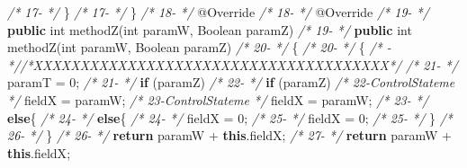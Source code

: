 \documentclass[
]{article}
\newenvironment{Shaded}{\begin{snugshade}}{\end{snugshade}}
\newcommand{\AttributeTok}[1]{\textcolor[rgb]{0.77,0.63,0.00}{#1}}
\newcommand{\BuiltInTok}[1]{#1}
\newcommand{\CommentTok}[1]{\textcolor[rgb]{0.56,0.35,0.01}{\textit{#1}}}
\newcommand{\DataTypeTok}[1]{\textcolor[rgb]{0.13,0.29,0.53}{#1}}
\newcommand{\DecValTok}[1]{\textcolor[rgb]{0.00,0.00,0.81}{#1}}
\newcommand{\FunctionTok}[1]{\textcolor[rgb]{0.00,0.00,0.00}{#1}}
\newcommand{\KeywordTok}[1]{\textcolor[rgb]{0.13,0.29,0.53}{\textbf{#1}}}
\newcommand{\NormalTok}[1]{#1}
\begin{document}
\begin{landscape}
\begin{Shaded}
\begin{Highlighting}[]
\CommentTok{/* 17-                 */}\NormalTok{    \}                                                          }\CommentTok{/* 17-                 */}\NormalTok{    \}                                                          }
\CommentTok{/* 18-                 */}    \AttributeTok{@Override}                                                  \CommentTok{/* 18-                 */}    \AttributeTok{@Override}                                                  
\CommentTok{/* 19-                 */}    \KeywordTok{public} \DataTypeTok{int} \FunctionTok{methodZ}\NormalTok{(}\DataTypeTok{int}\NormalTok{ paramW, }\BuiltInTok{Boolean}\NormalTok{ paramZ)             }\CommentTok{/* 19-                 */}    \KeywordTok{public} \DataTypeTok{int} \FunctionTok{methodZ}\NormalTok{(}\DataTypeTok{int}\NormalTok{ paramW, }\BuiltInTok{Boolean}\NormalTok{ paramZ)             }
\CommentTok{/* 20-                 */}\NormalTok{    \{                                                          }\CommentTok{/* 20-                 */}\NormalTok{    \{                                                          }
\CommentTok{/*   -                 *//*XXXXXXXXXXXXXXXXXXXXXXXXXXXXXXXXXXXXXX*/}                     \CommentTok{/* 21-                 */}\NormalTok{       paramT = }\DecValTok{0}\NormalTok{;                                                    }
\CommentTok{/* 21-                 */}        \KeywordTok{if}\NormalTok{ (paramZ)                                            }\CommentTok{/* 22-                 */}        \KeywordTok{if}\NormalTok{ (paramZ)                                            }
\CommentTok{/* 22-ControlStateme   */}\NormalTok{            fieldX = paramW;                                   }\CommentTok{/* 23-ControlStateme   */}\NormalTok{            fieldX = paramW;                                   }
\CommentTok{/* 23-                 */}        \KeywordTok{else}\NormalTok{\{                                                  }\CommentTok{/* 24-                 */}        \KeywordTok{else}\NormalTok{\{                                                  }
\CommentTok{/* 24-                 */}\NormalTok{            fieldX = }\DecValTok{0}\NormalTok{;                                        }\CommentTok{/* 25-                 */}\NormalTok{            fieldX = }\DecValTok{0}\NormalTok{;                                        }
\CommentTok{/* 25-                 */}\NormalTok{        \}                                                      }\CommentTok{/* 26-                 */}\NormalTok{        \}                                                      }
\CommentTok{/* 26-                 */}        \KeywordTok{return}\NormalTok{ paramW + }\KeywordTok{this}\NormalTok{.}\FunctionTok{fieldX}\NormalTok{;                           }\CommentTok{/* 27-                 */}        \KeywordTok{return}\NormalTok{ paramW + }\KeywordTok{this}\NormalTok{.}\FunctionTok{fieldX}\NormalTok{;                           }

\end{Highlighting}
\end{Shaded}
\end{landscape}
\end{document}
